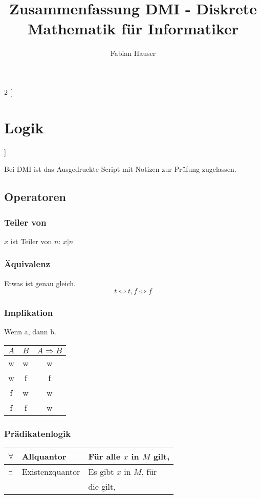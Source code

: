 

\title{Zusammenfassung DMI - Diskrete Mathematik für Informatiker}
\author{Fabian Hauser}
 

\maketitle
\begin{multicols}{2}
[
\section{Logik}
]

	Bei DMI ist das Ausgedruckte Script mit Notizen zur Prüfung zugelassen.

\subsection{Operatoren}


\subsubsection{Teiler von}
	$x$ ist Teiler von $n$: $x|n$

\subsubsection{Äquivalenz}
	Etwas ist genau gleich.
	\[
	t \Leftrightarrow t, f \Leftrightarrow f
	\]

\subsubsection{Implikation}
	Wenn a, dann b.
	
	\begin{tabular}{| c | c | c |}
	\hline 
	$A$ & $B$ & $A \Rightarrow B$ \\
	\hline
	w & w & w \\
	w & f & f \\
	f & w & w \\
	f & f & w \\
	\hline
	\end{tabular}



\subsubsection{Prädikatenlogik}
	\begin{tabular}{| l | l | l |}
		\hline
		$\forall$ & Allquantor & Für alle $x$ in $M$ gilt, \\ \hline
		$\exists$ & Existenzquantor &
		Es gibt $x$ in $M$, für \\
		& & die gilt, \\
		\hline
	\end{tabular}


\end{multicols}
